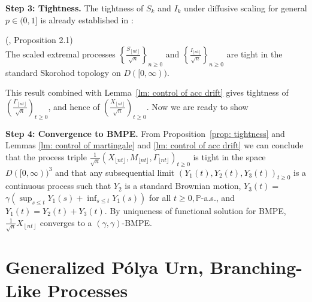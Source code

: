 \documentclass[EJP]{ejpecp} %
\begin{document}
\vspace{1em}

\textbf{Step 3: Tightness.} The tightness of $S_k$ and $I_k$ under diffusive scaling for general $p \in (0,1]$ is already established in \cite{KMP23}:
\begin{proposition}
	(\cite{KMP23}, Proposition 2.1)\\
	\label{prop: tightness}
	The scaled extremal processes $\left\{\frac{S_{\left\lfloor n t \right\rfloor}}{\sqrt{n}}\right\}_{n \geq 0}$ and $\left\{\frac{I_{\lfloor n t \rfloor}}{\sqrt{n}}\right\}_{n \geq 0}$ are tight in the standard Skorohod topology on $D([0, \infty))$.
\end{proposition}
This result combined with Lemma~\ref{lm: control of acc drift} gives tightness of $\left(\frac{\Gamma_{\left\lfloor nt  \right\rfloor}}{\sqrt{n} }\right)_{t \ge 0}$, and hence of $\left(\frac{X_{\left\lfloor nt  \right\rfloor}}{\sqrt{n} }\right)_{t \ge 0}$. 
Now we are ready to show
\vspace{1em}

\textbf{Step 4: Convergence to BMPE.} 
From Proposition~\ref{prop: tightness} and Lemmas \ref{lm: control of martingale} and \ref{lm: control of acc drift} we can conclude that the process triple $\frac{1}{\sqrt{n}}\left(X_{\lfloor n t\rfloor}, M_{\lfloor n t\rfloor}, \Gamma_{\lfloor n t\rfloor}\right)_{t \geq 0}$ is tight in the space $D([0, \infty))^3$ and that any subsequential limit $\left(Y_1(t), Y_2(t), Y_3(t)\right)_{t \geq 0}$ is a continuous process such that $Y_2$ is a standard Brownian motion, $Y_3(t)=$ $\gamma\left(\sup _{s \leq t} Y_1(s)+\inf _{s \leq t} Y_1(s)\right)$ for all $t \geq 0, \mathbb{P}$-a.s., and $Y_1(t)=Y_2(t)+Y_3(t)$. By uniqueness of functional solution for BMPE, $\frac{1}{\sqrt{n} } X_{\left\lfloor nt  \right\rfloor}$ converges to a $(\gamma, \gamma)$-BMPE.

\section{Generalized P\'{o}lya Urn, Branching-Like Processes}\label{sec: generalized Polya Urn, BLP}
\end{document}
